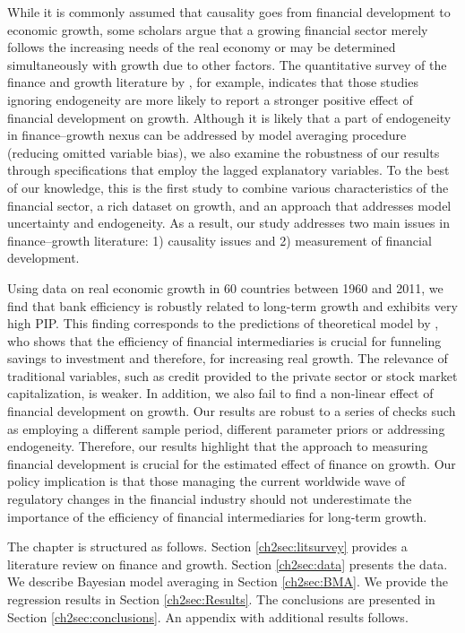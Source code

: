 \begin{refsection}
While it is commonly assumed that causality goes from financial development to economic growth, some scholars argue that a growing financial sector merely follows the increasing needs of the real economy or may be determined simultaneously with growth due to other factors. The quantitative survey of the finance and growth literature by \textcite{Valickovaetal2014}, for example, indicates that those studies ignoring endogeneity are more likely to report a stronger positive effect of financial development on growth. Although it is likely that a part of endogeneity in finance--growth nexus can be addressed by model averaging procedure (reducing omitted variable bias), we also examine the robustness of our results through specifications that employ the lagged explanatory variables. To the best of our knowledge, this is the first study to combine various characteristics of the financial sector, a rich dataset on growth, and an approach that addresses model uncertainty and endogeneity. As a result, our study addresses two main issues in finance--growth literature: 1) causality issues and 2) measurement of financial development.

Using data on real economic growth in 60 countries between 1960 and 2011, we find that bank efficiency is robustly related to long-term growth and exhibits very high \ac{PIP}. This finding corresponds to the predictions of theoretical model by \textcite{Pagano1993}, who shows that the efficiency of financial intermediaries is crucial for funneling savings to investment and therefore, for increasing real growth. The relevance of traditional variables, such as credit provided to the private sector or stock market capitalization, is weaker. In addition, we also fail to find a non-linear effect of financial development on growth.  Our results are robust to a series of checks such as employing a different sample period, different parameter priors or addressing endogeneity. Therefore, our results highlight that the approach to measuring financial development is crucial for the estimated effect of finance on growth. Our policy implication is that those managing the current worldwide wave of regulatory changes in the financial industry should not underestimate the importance of the efficiency of financial intermediaries for long-term growth.

The chapter is structured as follows. Section \ref{ch2sec:litsurvey} provides a literature review on finance and growth. Section \ref{ch2sec:data} presents the data. We describe Bayesian model averaging in Section \ref{ch2sec:BMA}. We provide the regression results in Section \ref{ch2sec:Results}. The conclusions are presented in Section \ref{ch2sec:conclusions}. An appendix with additional results follows. 
%
%
% 
%
%

\end{refsection}
